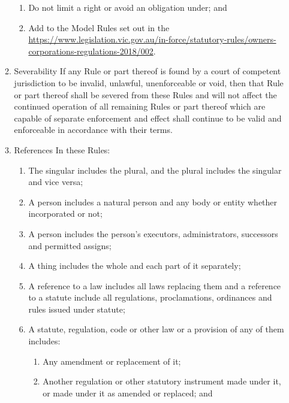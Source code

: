 \documentclass{article}
\begin{document}
\begin{enumerate}[label=\arabic*.]
\begin{enumerate}[label=\arabic{enumi}.\arabic*.]
\begin{enumerate}[label=(\arabic*)]
\item  Do not limit a right or avoid an obligation under; and

\item  Add to the Model Rules set out in the \href{Owners Corporations Regulations}{https://www.legislation.vic.gov.au/in-force/statutory-rules/owners-corporations-regulations-2018/002}.

\end{enumerate}

\item  Severability If any Rule or part thereof is found by a court of competent jurisdiction to be invalid, unlawful, unenforceable or void, then that Rule or part thereof shall be severed from these Rules and will not affect the continued operation of all remaining Rules or part thereof which are capable of separate enforcement and effect shall continue to be valid and enforceable in accordance with their terms.

\item  References In these Rules:

\begin{enumerate}[label=(\arabic*)]

\item  The singular includes the plural, and the plural includes the singular and vice versa;

\item  A person includes a natural person and any body or entity whether incorporated or not;

\item  A person includes the person’s executors, administrators, successors and permitted assigns;

\item  A thing includes the whole and each part of it separately;

\item  A reference to a law includes all laws replacing them and a reference to a statute include all regulations, proclamations, ordinances and rules issued under statute;

\item  A statute, regulation, code or other law or a provision of any of them includes:

\begin{enumerate}[label=(\alph*)]

\item  Any amendment or replacement of it;

\item  Another regulation or other statutory instrument made under it, or made under it as amended or replaced; and


\end{enumerate}
\end{enumerate}
\end{enumerate}
\end{enumerate}
\end{document}
